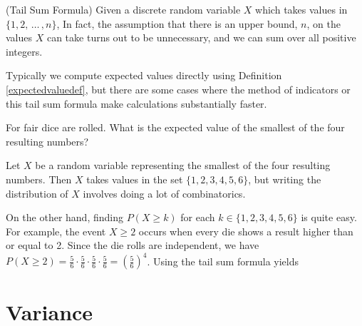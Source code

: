 \begin{prop}\label{Discrete Tail Sum Formula}(Tail Sum Formula)
Given a discrete random variable $X$ which takes values in $\{1,2,\,\dots\,,n\}$,
In fact, the assumption that there is an upper bound, $n$, on the values $X$ can take turns out to be unnecessary, and we can sum over all positive integers.
\end{prop}
\par
Typically we compute expected values directly using Definition \ref{expectedvaluedef}, but there are some cases where the method of indicators or this tail sum formula make calculations substantially faster.
\begin{examp}
For fair dice are rolled. What is the expected value of the smallest of the four resulting numbers?
\par
\noindent Let $X$ be a random variable representing the smallest of the four resulting numbers. Then $X$ takes values in the set $\{1,2,3,4,5,6\}$, but writing the distribution of $X$ involves doing a lot of combinatorics. 
\par
\noindent On the other hand, finding $P(X \geq k)$ for each $k \in \{1,2,3,4,5,6\}$ is quite easy. For example, the event $X \geq 2$ occurs when every die shows a result higher than or equal to 2. Since the die rolls are independent, we have $P(X\geq2) = \frac{5}{6}\cdot\frac{5}{6}\cdot\frac{5}{6}\cdot \frac{5}{6} = (\frac{5}{6})^4$. Using the tail sum formula yields
\end{examp}

\section{Variance}

